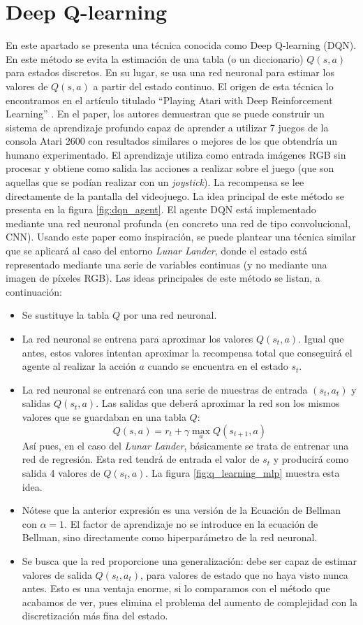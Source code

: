\documentclass{article}
\begin{document}
\section{Deep Q-learning}
En este apartado se presenta una técnica conocida como Deep Q-learning (DQN). En este método se evita la estimación de una tabla (o un diccionario) $Q(s,a)$ para estados discretos. En su lugar, se usa una red neuronal para estimar los valores de $Q(s,a)$ a partir del estado continuo.
El origen de esta técnica lo encontramos en el artículo titulado ``Playing Atari with Deep Reinforcement Learning'' \cite{MnihKSGAWR13}. En el paper, los autores demuestran que se puede construir un sistema de aprendizaje profundo capaz de aprender a utilizar 7 juegos de la consola Atari 2600 con resultados similares o mejores de los que obtendría un humano experimentado. El aprendizaje utiliza como entrada imágenes RGB sin procesar y obtiene como salida las acciones a realizar sobre el juego (que son aquellas que se podían realizar con un \textit{joystick}). La recompensa se lee directamente de la pantalla del videojuego. La idea principal de este método se presenta en la figura \ref{fig:dqn_agent}. El agente DQN está implementado mediante una red neuronal profunda (en concreto una red de tipo convolucional, CNN). Usando este paper como inspiración, se puede plantear una técnica similar que se aplicará al caso del entorno \textit{Lunar Lander}, donde el estado está representado mediante una serie de variables continuas (y no mediante una imagen de píxeles RGB). Las ideas principales de este método se listan, a continuación:
\begin{itemize}
    \item Se sustituye la tabla $Q$ por una red neuronal.
    \item La red neuronal se entrena para aproximar los valores $Q(s_t, a)$. Igual que antes, estos valores intentan aproximar la recompensa total que conseguirá el agente al realizar la acción $a$ cuando se encuentra en el estado $s_t$.
    \item La red neuronal se entrenará con una serie de muestras de entrada $(s_t, a_t)$ y salidas $Q(s_t, a)$. Las salidas que deberá aproximar la red son los mismos valores que se guardaban en una tabla $Q$:
    $$Q(s, a) = r_t+\gamma\max_a{Q(s_{t+1}, a)}$$
    Así pues, en el caso del \textit{Lunar Lander}, básicamente se trata de entrenar una red de regresión. Esta red tendrá de entrada el valor de $s_t$ y producirá como salida 4 valores de $Q(s_t, a)$. La figura \ref{fig:q_learning_mlp} muestra esta idea.
    \item Nótese que la anterior expresión es una versión de la Ecuación de Bellman con $\alpha=1$. El factor de aprendizaje no se introduce en la ecuación de Bellman, sino directamente como hiperparámetro de la red neuronal.
    \item Se busca que la red proporcione una generalización: debe ser capaz de estimar valores de  salida $Q(s_t, a_t)$, para valores de estado que no haya visto nunca antes. Esto es una ventaja enorme, si lo comparamos con el método que acabamos de ver, pues elimina el problema del aumento de complejidad con la discretización más fina del estado.
\end{itemize}
\end{document}
